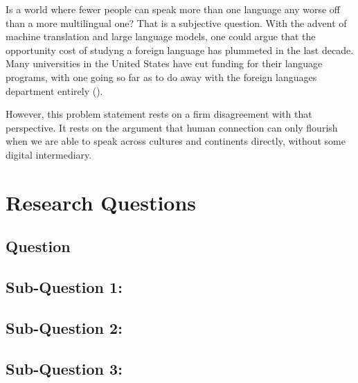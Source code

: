 \documentclass[
	letterpaper, %
]{jdf}
\newcommand{\pcite}[1]{(\cite{#1})}
\begin{document}
Is a world where fewer people can speak more than one language any worse off than a more multilingual one? That is a subjective question. With the advent of machine translation and large language models, one could argue that the opportunity cost of studyng a foreign language has plummeted in the last decade. Many universities in the United States have cut funding for their language programs, with one going so far as to do away with the foreign languages department entirely \pcite{wvmetronews2023}.

However, this problem statement rests on a firm disagreement with that perspective. It rests on the argument that human connection can only flourish when we are able to speak across cultures and continents directly, without some digital intermediary.

\section{Research Questions}

\subsection{Question}

\subsection{Sub-Question 1:}

\subsection{Sub-Question 2:}

\subsection{Sub-Question 3:}



\end{document}
